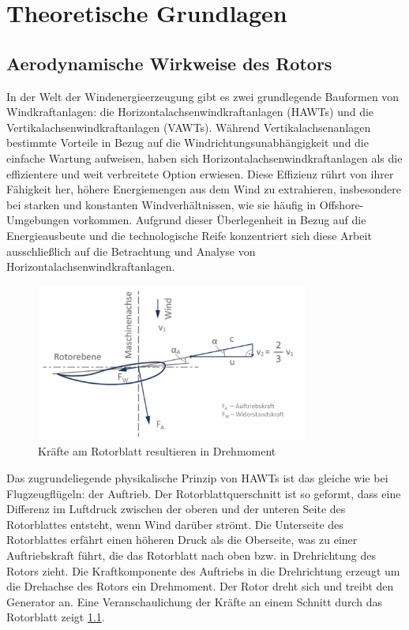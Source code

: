 \chapter{Theoretische Grundlagen}

\section{Aerodynamische Wirkweise des Rotors}
In der Welt der Windenergieerzeugung gibt es zwei grundlegende Bauformen von Windkraftanlagen: die Horizontalachsenwindkraftanlagen (HAWTs) und die Vertikalachsenwindkraftanlagen (VAWTs). Während Vertikalachsenanlagen bestimmte Vorteile in Bezug auf die Windrichtungsunabhängigkeit und die einfache Wartung aufweisen, haben sich Horizontalachsenwindkraftanlagen als die effizientere und weit verbreitete Option erwiesen. Diese Effizienz rührt von ihrer Fähigkeit her, höhere Energiemengen aus dem Wind zu extrahieren, insbesondere bei starken und konstanten Windverhältnissen, wie sie häufig in Offshore-Umgebungen vorkommen. Aufgrund dieser Überlegenheit in Bezug auf die Energieausbeute und die technologische Reife konzentriert sich diese Arbeit ausschließlich auf die Betrachtung und Analyse von Horizontalachsenwindkraftanlagen.

\begin{figure}[htbp] %
    \centering %
    \includegraphics[width=0.8\textwidth]{figures/winddreieck.png} %
    \caption{Kräfte am Rotorblatt resultieren in Drehmoment \cite{noauthor_aerodynamik_nodate}} %
    \label{fig:winddreieck} %
\end{figure}

Das zugrundeliegende physikalische Prinzip von HAWTs ist das gleiche wie bei Flugzeugflügeln: der Auftrieb.
Der Rotorblattquerschnitt ist so geformt, dass eine Differenz im Luftdruck zwischen der oberen und der unteren Seite des Rotorblattes entsteht, wenn Wind darüber strömt.
Die Unterseite des Rotorblattes erfährt einen höheren Druck als die Oberseite, was zu einer Auftriebskraft führt, die das Rotorblatt nach oben bzw. in Drehrichtung des Rotors zieht.
Die Kraftkomponente des Auftriebs in die Drehrichtung erzeugt um die Drehachse des Rotors ein Drehmoment. Der Rotor dreht sich und treibt den Generator an. Eine Veranschaulichung der Kräfte an einem Schnitt durch das Rotorblatt zeigt \cref{fig:winddreieck}.

